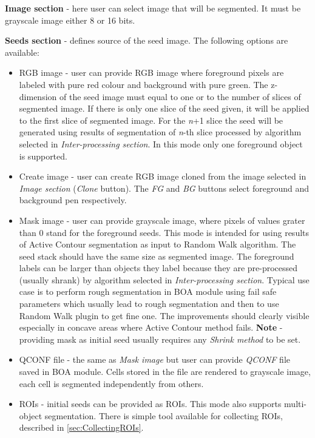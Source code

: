 \documentclass[a4paper,12pt]{article}
\begin{document}
\textbf{Image section} - here user can select image that will be segmented. It must be grayscale image either 8 or 16 bits.

\textbf{Seeds section} - defines source of the seed image. The following options are available:
\begin{itemize}
	\item RGB image - user can provide RGB image where foreground pixels are labeled with pure red colour and background with pure green. The z-dimension of the seed image must equal to one or to the number of slices of segmented image. If there is only one slice of the seed given, it will be applied to the first slice of segmented image. For the \textit{n}+1 slice the seed will be generated using results of segmentation of \textit{n}-th slice processed by algorithm selected in \textit{Inter-processing section}.
	In this mode only one foreground object is supported.
	\item Create image - user can create RGB image cloned from the image selected in \textit{Image section} (\textit{Clone} button). The \textit{FG} and \textit{BG} buttons select foreground and background pen respectively.
	\item Mask image - user can provide grayscale image, where pixels of values grater than 0 stand for the foreground seeds. This mode is intended for using results of Active Contour segmentation as input to Random Walk algorithm. The seed stack should have the same size as segmented image. The foreground labels can be larger than objects they label because they are pre-processed (usually shrank) by algorithm selected in \textit{Inter-processing section}. Typical use case is to perform rough segmentation in BOA module using fail safe parameters which usually lead to rough segmentation and then to use Random Walk plugin to get fine one. The improvements should clearly visible especially in concave areas where Active Contour method fails. \textbf{Note} - providing mask as initial seed usually requires any \textit{Shrink method} to be set.      
	\item QCONF file - the same as \textit{Mask image} but user can provide \textit{QCONF} file saved in BOA module. Cells stored in the file are rendered to grayscale image, each cell is segmented independently from others.
	\item ROIs - initial seeds can be provided as ROIs. This mode also supports multi-object segmentation. There is simple tool available for collecting ROIs, described in \autoref{sec:CollectingROIs}.   
\end{itemize}
  
\end{document}
